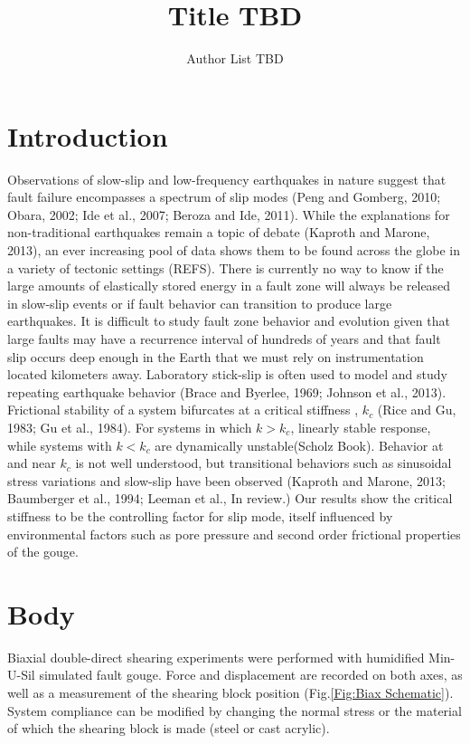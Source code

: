 \documentclass[11pt]{article}
\title{Title TBD}
\author{Author List TBD}
\begin{document}
\maketitle

\section{Introduction}
Observations of slow-slip and low-frequency earthquakes in nature suggest that
fault failure encompasses a spectrum of slip modes (Peng and Gomberg, 2010;
Obara, 2002; Ide et al., 2007; Beroza and Ide, 2011). While the explanations for
non-traditional earthquakes remain a topic of debate (Kaproth and Marone, 2013),
an ever increasing pool of data shows them to be found across the globe in a
variety of tectonic settings (REFS). There is currently no way to know if the
large amounts of elastically stored energy in a fault zone will always be
released in slow-slip events or if fault behavior can transition to produce
large earthquakes. It is difficult to study fault zone behavior and evolution
given that large faults may have a recurrence interval of hundreds of years and
that fault slip occurs deep enough in the Earth that we must rely on
instrumentation located kilometers away. Laboratory stick-slip is often used to
model and study repeating earthquake behavior (Brace and Byerlee, 1969; Johnson
et al., 2013). Frictional stability of a system bifurcates at a critical
stiffness , $k_c$ (Rice and Gu, 1983; Gu et al., 1984). For systems in which
$k>k_c$, linearly stable response, while systems with $k<k_c$ are dynamically
unstable(Scholz Book). Behavior at and near $k_c$ is not well understood, but
transitional behaviors such as sinusoidal stress variations and slow-slip have
been observed (Kaproth and Marone, 2013; Baumberger et al., 1994; Leeman et al.,
In review.) Our results show the critical stiffness to be the controlling factor
for slip mode, itself influenced by environmental factors such as pore pressure
and second order frictional properties of the gouge.  

\section{Body}
Biaxial double-direct shearing experiments were performed with humidified
Min-U-Sil simulated fault gouge. Force and displacement are recorded on both
axes, as well as a measurement of the shearing block position
(Fig.\ref{Fig:Biax Schematic}). System compliance can be modified by changing
the normal stress or the material of which the shearing block is made (steel
or cast acrylic).  
\end{document}
